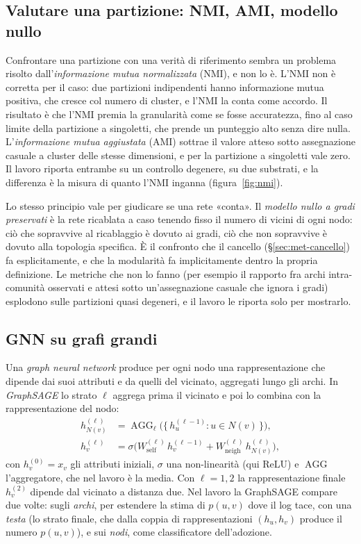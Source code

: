 \documentclass[11pt,a4paper]{article}
\begin{document}
\subsection{Valutare una partizione: NMI, AMI, modello nullo}
Confrontare una partizione con una verità di riferimento sembra un problema risolto dall'\emph{informazione mutua normalizzata} (NMI), e non lo è. L'NMI non è corretta per il caso: due partizioni indipendenti hanno informazione mutua positiva, che cresce col numero di cluster, e l'NMI la conta come accordo. Il risultato è che l'NMI premia la granularità come se fosse accuratezza, fino al caso limite della partizione a singoletti, che prende un punteggio alto senza dire nulla. L'\emph{informazione mutua aggiustata} (AMI) \citep{vinh2010} sottrae il valore atteso sotto assegnazione casuale a cluster delle stesse dimensioni, e per la partizione a singoletti vale zero. Il lavoro riporta entrambe su un controllo degenere, su due substrati, e la differenza è la misura di quanto l'NMI inganna (figura~\ref{fig:nmi}).

Lo stesso principio vale per giudicare se una rete «conta». Il \emph{modello nullo a gradi preservati} \citep{maslov2002} è la rete ricablata a caso tenendo fisso il numero di vicini di ogni nodo: ciò che sopravvive al ricablaggio è dovuto ai gradi, ciò che non sopravvive è dovuto alla topologia specifica. È il confronto che il cancello (\S\ref{sec:met-cancello}) fa esplicitamente, e che la modularità fa implicitamente dentro la propria definizione. Le metriche che non lo fanno (per esempio il rapporto fra archi intra-comunità osservati e attesi sotto un'assegnazione casuale che ignora i gradi) esplodono sulle partizioni quasi degeneri, e il lavoro le riporta solo per mostrarlo.

\subsection{GNN su grafi grandi}
Una \emph{graph neural network} produce per ogni nodo una rappresentazione che dipende dai suoi attributi e da quelli del vicinato, aggregati lungo gli archi. In \emph{GraphSAGE} \citep{hamilton2017} lo strato $\ell$ aggrega prima il vicinato e poi lo combina con la rappresentazione del nodo:
\begin{align}
  h^{(\ell)}_{N(v)} &= \operatorname{AGG}_\ell\big(\{\, h^{(\ell-1)}_u : u \in N(v) \,\}\big), \\
  h^{(\ell)}_v &= \sigma\big( W_{\mathrm{self}}^{(\ell)}\, h^{(\ell-1)}_v + W_{\mathrm{neigh}}^{(\ell)}\, h^{(\ell)}_{N(v)} \big),
  \label{eq:sage}
\end{align}
con $h^{(0)}_v = x_v$ gli attributi iniziali, $\sigma$ una non-linearità (qui ReLU) e $\operatorname{AGG}$ l'aggregatore, che nel lavoro è la media. Con $\ell = 1, 2$ la rappresentazione finale $h^{(2)}_v$ dipende dal vicinato a distanza due. Nel lavoro la GraphSAGE compare due volte: sugli \emph{archi}, per estendere la stima di $p(u,v)$ dove il log tace, con una \emph{testa} (lo strato finale, che dalla coppia di rappresentazioni $(h_u, h_v)$ produce il numero $p(u,v)$), e sui \emph{nodi}, come classificatore dell'adozione.
\end{document}
